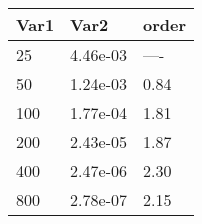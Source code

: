 \begin{tabular}{lll}
Var1 & Var2 & order \\ 
\hline 
25 & 4.46e-03 & ---- \\ 
50 & 1.24e-03 & 0.84 \\ 
100 & 1.77e-04 & 1.81 \\ 
200 & 2.43e-05 & 1.87 \\ 
400 & 2.47e-06 & 2.30 \\ 
800 & 2.78e-07 & 2.15 \\ 
\hline 
\end{tabular}